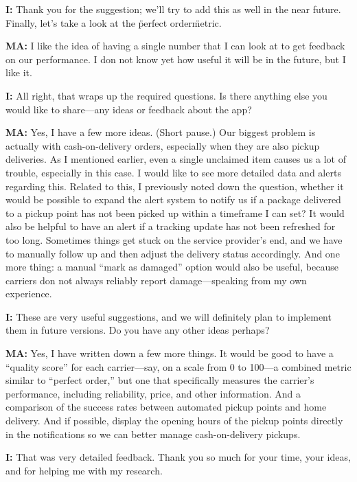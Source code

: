 \documentclass{imc-inf}
\begin{document}
\begin{appendices}
  \noindent\textbf{I:} Thank you for the suggestion; we'll try to add this as well in the near future. Finally, let's take a look at the \"perfect order\" metric.

  \noindent\textbf{MA:} I like the idea of having a single number that I can look at to get feedback on our performance. I don not know yet how useful it will be in the future, but I like it.

  \noindent\textbf{I:} All right, that wraps up the required questions. Is there anything else you would like to share—any ideas or feedback about the app?

  \noindent\textbf{MA:} Yes, I have a few more ideas. (Short pause.) Our biggest problem is actually with cash-on-delivery orders, especially when they are also pickup deliveries. As I mentioned earlier, even a single unclaimed item causes us a lot of trouble, especially in this case. I would like to see more detailed data and alerts regarding this. Related to this, I previously noted down the question, whether it would be possible to expand the alert system to notify us if a package delivered to a pickup point has not been picked up within a timeframe I can set? It would also be helpful to have an alert if a tracking update has not been refreshed for too long. Sometimes things get stuck on the service provider's end, and we have to manually follow up and then adjust the delivery status accordingly. And one more thing: a manual “mark as damaged” option would also be useful, because carriers don not always reliably report damage—speaking from my own experience.

  \noindent\textbf{I:} These are very useful suggestions, and we will definitely plan to implement them in future versions. Do you have any other ideas perhaps?

  \noindent\textbf{MA:} Yes, I have written down a few more things. It would be good to have a “quality score” for each carrier—say, on a scale from 0 to 100—a combined metric similar to “perfect order,” but one that specifically measures the carrier's performance, including reliability, price, and other information. And a comparison of the success rates between automated pickup points and home delivery. And if possible, display the opening hours of the pickup points directly in the notifications so we can better manage cash-on-delivery pickups.

  \noindent\textbf{I:} That was very detailed feedback. Thank you so much for your time, your ideas, and for helping me with my research.


\end{appendices}
\end{document}
